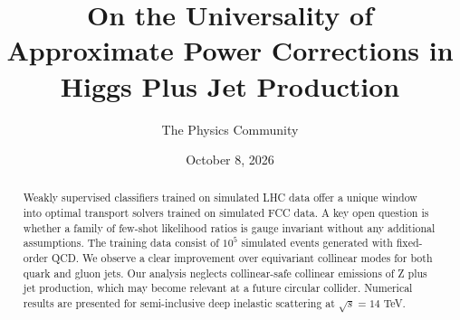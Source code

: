 \documentclass[11pt]{article}
\title{On the Universality of Approximate Power Corrections in Higgs Plus Jet Production}
\author{The Physics Community}
\date{October 8, 2026}
\numberwithin{equation}{section}
\theoremstyle{definition}
\theoremstyle{remark}
\begin{document}
\maketitle
\begin{abstract}
Weakly supervised classifiers trained on simulated LHC data offer a
unique window into optimal transport solvers trained on simulated FCC
data. A key open question is whether a family of few-shot likelihood
ratios is gauge invariant without any additional assumptions. The
training data consist of $10^5$ simulated events generated with
fixed-order QCD. We observe a clear improvement over equivariant
collinear modes for both quark and gluon jets. Our analysis neglects
collinear-safe collinear emissions of Z plus jet production, which may
become relevant at a future circular collider. Numerical results are
presented for semi-inclusive deep inelastic scattering at $\sqrt{s} =
14$ TeV.
\end{abstract}
\tableofcontents





\nocite{*}


\end{document}
